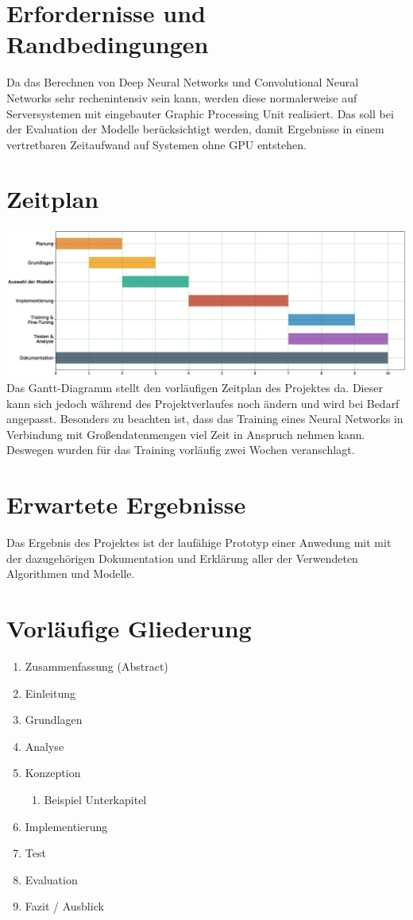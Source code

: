 \section{Erfordernisse und Randbedingungen}
Da das Berechnen von Deep Neural Networks und Convolutional Neural Networks sehr rechenintensiv sein kann,
werden diese normalerweise auf Serversystemen mit eingebauter Graphic Processing Unit realisiert. Das soll bei der Evaluation der 
Modelle berücksichtigt werden, damit Ergebnisse in einem vertretbaren Zeitaufwand auf Systemen ohne GPU entstehen.

\section{Zeitplan}
\includegraphics[width=1.00\textwidth]{resources/gantt.eps}
Das Gantt-Diagramm stellt den vorläufigen Zeitplan des Projektes da.
Dieser kann sich jedoch während des Projektverlaufes noch ändern und wird bei Bedarf angepasst.
Besonders zu beachten ist, dass das Training eines Neural Networks in Verbindung mit Großendatenmengen viel Zeit in Anspruch nehmen kann.
Deswegen wurden für das Training vorläufig zwei Wochen veranschlagt.

\section{Erwartete Ergebnisse}
Das Ergebnis des Projektes ist der laufähige Prototyp einer Anwedung mit mit der dazugehörigen Dokumentation und Erklärung
aller der Verwendeten Algorithmen und Modelle.

\section{Vorläufige Gliederung}

\begin{enumerate}
	\item Zusammenfassung (Abstract)
	\item Einleitung
	\item Grundlagen
	\item Analyse
	\item Konzeption
	\begin{enumerate}[label*=\arabic*.]
		\item Beispiel Unterkapitel
	\end{enumerate}
	\item Implementierung
	\item Test
	\item Evaluation
	\item Fazit / Ausblick
\end{enumerate}


\printbibliography[heading=bibintoc, filter=scientific, title={Literaturangaben}]


